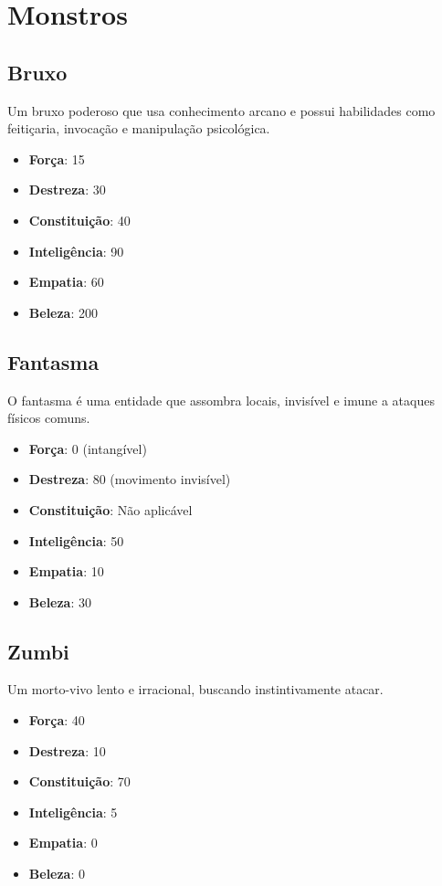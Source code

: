 \documentclass[a4paper,12pt]{book}
\begin{document}
\section{Monstros}

\subsection{Bruxo}

Um bruxo poderoso que usa conhecimento arcano e possui habilidades como feitiçaria, invocação e manipulação psicológica.

\begin{itemize}
    \item \textbf{Força}: 15
    \item \textbf{Destreza}: 30
    \item \textbf{Constituição}: 40
    \item \textbf{Inteligência}: 90
    \item \textbf{Empatia}: 60
    \item \textbf{Beleza}: 200
\end{itemize}

\subsection{Fantasma}

O fantasma é uma entidade que assombra locais, invisível e imune a ataques físicos comuns.

\begin{itemize}
    \item \textbf{Força}: 0 (intangível)
    \item \textbf{Destreza}: 80 (movimento invisível)
    \item \textbf{Constituição}: Não aplicável
    \item \textbf{Inteligência}: 50
    \item \textbf{Empatia}: 10
        \item \textbf{Beleza}: 30
\end{itemize}

\subsection{Zumbi}

Um morto-vivo lento e irracional, buscando instintivamente atacar.

\begin{itemize}
    \item \textbf{Força}: 40
    \item \textbf{Destreza}: 10
    \item \textbf{Constituição}: 70
    \item \textbf{Inteligência}: 5
    \item \textbf{Empatia}: 0
     \item \textbf{Beleza}: 0
\end{itemize}
\end{document}
